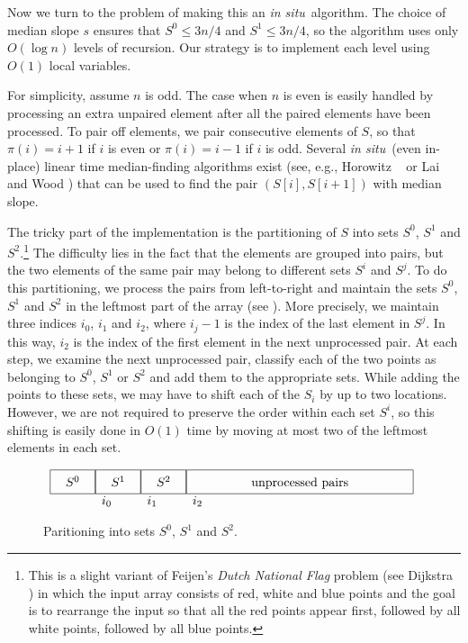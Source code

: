 \documentclass{elsart}
\newcommand{\insitu}{\emph{in situ}}
\newcommand{\inplace}{in-place}
\begin{document}
Now we turn to the problem of making this an \insitu\ algorithm.  The
choice of median slope $s$ ensures that $S^0\le 3n/4$ and $S^1\le
3n/4$, so the algorithm uses only $O(\log n)$ levels of recursion.
Our strategy is to implement each level using $O(1)$ local variables.

For simplicity, assume $n$ is odd. The case when $n$ is even is easily
handled by processing an extra unpaired element after all the paired
elements have been processed.  To pair off elements, we pair
consecutive elements of $S$, so that $\pi(i)=i+1$ if $i$ is even or
$\pi(i)=i-1$ if $i$ is odd.  Several \insitu\ (even \inplace) linear
time median-finding algorithms exist (see, e.g., \mbox{Horowitz}
\etal\ \cite[Section~3.6]{hsr97} or Lai and Wood \cite{lw88}) that can
be used to find the pair $(S[i],S[i+1])$ with median slope.

The tricky part of the implementation is the partitioning of $S$ into
sets $S^0$, $S^1$ and $S^2$.\footnote{This is a slight variant of
Feijen's \emph{Dutch National Flag} problem (see Dijkstra \cite{d76})
in which the input array consists of red, white and blue points and
the goal is to rearrange the input so that all the red points appear
first, followed by all white points, followed by all blue points.}
The difficulty lies in the fact that the elements are grouped into
pairs, but the two elements of the same pair may belong to different
sets $S^i$ and $S^j$.  To do this partitioning, we process the pairs
from left-to-right and maintain the sets $S^0$, $S^1$ and $S^2$ in the
leftmost part of the array (see ).  More precisely,
we maintain three indices $i_0$, $i_1$ and $i_2$, where $i_j-1$ is the
index of the last element in $S^j$.  In this way, $i_2$ is the index
of the first element in the next unprocessed pair.  At each step, we
examine the next unprocessed pair, classify each of the two points as
belonging to $S^0$, $S^1$ or $S^2$ and add them to the appropriate
sets.  While adding the points to these sets, we may have to shift
each of the $S_i$ by up to two locations.  However, we are not
required to preserve the order within each set $S^i$, so this shifting
is easily done in $O(1)$ time by moving at most two of the leftmost
elements in each set.

\begin{figure}
\begin{center}
\vspace{2ex}
$\begin{array}{c@{}c@{}c@{}c}
      \framebox[.5in]{\fillit $S^0$} &
      \framebox[.5in]{\fillit $S^1$} &
      \framebox[.5in]{\fillit $S^2$} &
      \framebox[2.5in]{\fillit unprocessed pairs} \\
      &\multicolumn{1}{l}{i_0} & \multicolumn{1}{l}{i_1} & 
      \multicolumn{1}{l}{i_2} 
\end{array}$
\end{center}
\caption{Paritioning into sets $S^0$, $S^1$ and $S^2$.}
\end{figure}
\end{document}
